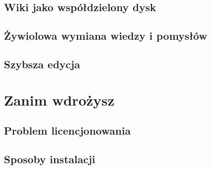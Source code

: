 \documentclass{article}
\begin{document}
	\subsection{Wiki jako współdzielony dysk}

\subsection{Żywiolowa wymiana wiedzy i pomysłów}


\subsection{Szybsza edycja}



\section{Zanim wdrożysz}
	\subsection {Problem licencjonowania}
	\subsection{Sposoby instalacji}
\end{document}
